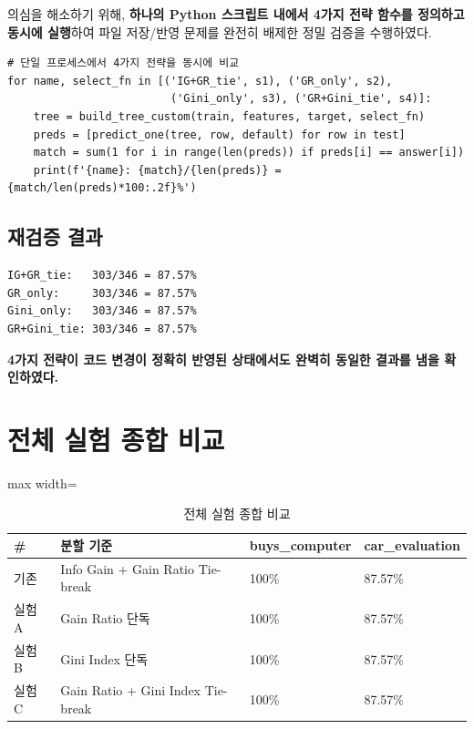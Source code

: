 \documentclass[12pt, a4paper]{article}
\begin{document}
의심을 해소하기 위해, \textbf{하나의 Python 스크립트 내에서 4가지 전략 함수를 정의하고 동시에 실행}하여 파일 저장/반영 문제를 완전히 배제한 정밀 검증을 수행하였다.

\begin{verbatim}
# 단일 프로세스에서 4가지 전략을 동시에 비교
for name, select_fn in [('IG+GR_tie', s1), ('GR_only', s2),
                         ('Gini_only', s3), ('GR+Gini_tie', s4)]:
    tree = build_tree_custom(train, features, target, select_fn)
    preds = [predict_one(tree, row, default) for row in test]
    match = sum(1 for i in range(len(preds)) if preds[i] == answer[i])
    print(f'{name}: {match}/{len(preds)} = {match/len(preds)*100:.2f}%')
\end{verbatim}

\subsection{재검증 결과}

\begin{verbatim}
IG+GR_tie:   303/346 = 87.57%
GR_only:     303/346 = 87.57%
Gini_only:   303/346 = 87.57%
GR+Gini_tie: 303/346 = 87.57%
\end{verbatim}

\textbf{4가지 전략이 코드 변경이 정확히 반영된 상태에서도 완벽히 동일한 결과를 냄을 확인하였다.}


\section{전체 실험 종합 비교}

\begin{table}[h]
\centering
\begin{adjustbox}{max width=\textwidth}
\begin{tabular}{llll}
\toprule
\textbf{\#} & \textbf{분할 기준} & \textbf{buys\_computer} & \textbf{car\_evaluation} \\
\midrule
기존   & Info Gain + Gain Ratio Tie-break       & 100\% & 87.57\% \\
실험 A & Gain Ratio 단독                        & 100\% & 87.57\% \\
실험 B & Gini Index 단독                        & 100\% & 87.57\% \\
실험 C & Gain Ratio + Gini Index Tie-break      & 100\% & 87.57\% \\
\bottomrule
\end{tabular}
\end{adjustbox}
\caption{전체 실험 종합 비교}
\end{table}
\end{document}
